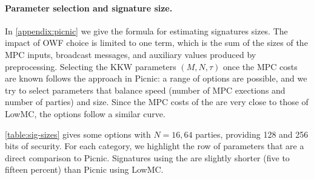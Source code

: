 \newcommand{\textunderbrace}[2]{{%
  \underbrace{#1}_{\text{#2}}
}}

\paragraph{Parameter selection and signature size.}
In \cref{appendix:picnic} we give the formula for estimating signatures sizes.
The impact of OWF choice is limited to one term, which is the sum of
the sizes of the MPC inputs, broadcast messages, and auxiliary values produced
by preprocessing.  Selecting the KKW parameters $(M, N, \tau)$ once the MPC costs
are known follows the approach in Picnic: a range of options are possible, and
we try to select parameters that balance speed (number of MPC exections and number of 
parties) and size.  Since the MPC costs of the \ttOWF are very close to those
of LowMC, the options follow a similar curve. 

\cref{table:sig-sizes} gives some options with $N=16, 64$ parties,
providing 128 and 256 bits of security. For each category, we highlight the row
of \ttOWF parameters that are a direct comparison to Picnic.  Signatures using
the \ttOWF are slightly shorter (five to fifteen percent) than Picnic using
LowMC. 


